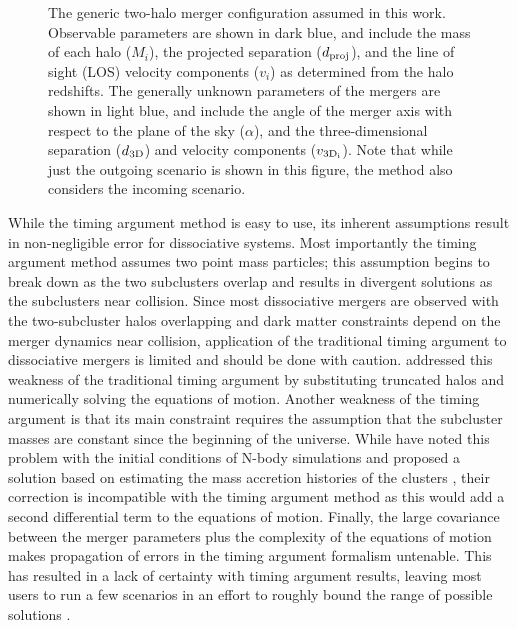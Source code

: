 \documentclass[12pt]{emulateapj}
\begin{document}
\begin{figure}
\caption{The generic two-halo merger configuration assumed in this work.  Observable parameters are shown in dark blue, and include the mass of each halo ($M_i$), the  projected separation ($d_{\rm proj}$), and the line of sight (LOS) velocity components ($v_i$) as determined from the halo redshifts. 
The generally unknown parameters of the mergers are shown in light blue, and include the angle of the merger axis with respect to the plane of the sky ($\alpha$), and the three-dimensional separation ($d_{\rm 3D}$) and velocity components ($v_{\rm 3D_i}$).
Note that while just the outgoing scenario is shown in this figure, the method also considers the incoming scenario.
\label{fig_mergerdiagram}}
\end{figure}  

While the timing argument method is easy to use, its inherent assumptions result in non-negligible error for dissociative systems.
Most importantly the timing argument method assumes two point mass particles; this assumption begins to break down as the two subclusters overlap and results in divergent solutions as the subclusters near collision.
Since most dissociative mergers are observed with the two-subcluster halos overlapping and dark matter constraints depend on the merger dynamics near collision, application of the traditional timing argument to dissociative mergers is limited and should be done with caution.
\citet{Nusser:2008iw} addressed this weakness of the traditional timing argument by substituting truncated \citet*[][hereafter NFW]{Navarro:1996ce} halos and numerically solving the equations of motion.
Another weakness of the timing argument is that its main constraint requires the  assumption that the subcluster masses are constant since the beginning of the universe.  
While \citet{Angus:2007em} have noted this problem with the initial conditions of N-body simulations and proposed a solution based on estimating the mass accretion histories of the clusters \citep[e.g.][]{Wechsler:2002kh}, their correction is incompatible with the timing argument method as this would add a second differential term to the equations of motion.
Finally, the large covariance between the merger parameters plus the complexity of the equations of motion makes propagation of errors in the timing argument formalism untenable.
This has resulted in a lack of certainty with timing argument results, leaving most users to run a few scenarios in an effort to roughly bound the range of possible solutions \citep[e.g.][]{Boschin:2012he}.  
\end{document}
